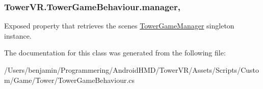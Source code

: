 \subsubsection[{\texorpdfstring{manager}{manager}}]{ Tower\+V\+R.\+Tower\+Game\+Behaviour.\+manager\hspace{0.3cm}{\ttfamily [get]}, {\ttfamily [protected]}}\hypertarget{class_tower_v_r_1_1_tower_game_behaviour_a5f0dc5fad7fbdcd09370d373329c00c7}{}\label{class_tower_v_r_1_1_tower_game_behaviour_a5f0dc5fad7fbdcd09370d373329c00c7}
Exposed property that retrieves the scene\textquotesingle{}s \hyperlink{class_tower_v_r_1_1_tower_game_manager}{Tower\+Game\+Manager} singleton instance. 

The documentation for this class was generated from the following file\+:\begin{DoxyCompactItemize}
\item 
/\+Users/benjamin/\+Programmering/\+Android\+H\+M\+D/\+Tower\+V\+R/\+Assets/\+Scripts/\+Custom/\+Game/\+Tower/Tower\+Game\+Behaviour.\+cs\end{DoxyCompactItemize}
